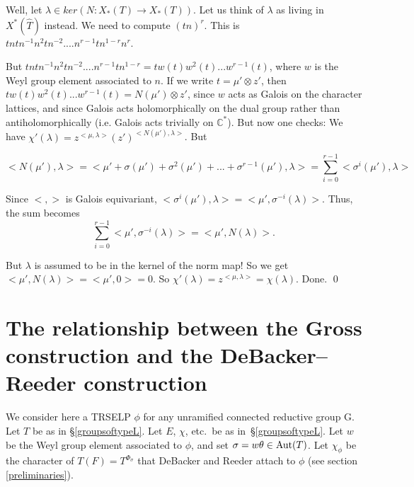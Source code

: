 \documentclass[11pt]{amsart}
\theoremstyle{plain}
\begin{document}
Well, let $\lambda \in ker(N : X_*(T) \rightarrow X_*(T))$.  Let us think of $\lambda$ as living in $X^*(\hat{T})$ instead.  We need to compute $(tn)^r$.  This is $t ntn^{-1} n^2 t n^{-2} .... n^{r-1} t n^{1-r} n^r$.

But $t ntn^{-1} n^2 t n^{-2} .... n^{r-1} t n^{1-r} = t w(t) w^2(t) ... w^{r-1}(t)$, where $w$ is the Weyl group element associated to $n$.  If we write $t = \mu' \otimes z'$, then $t w(t) w^2(t) ... w^{r-1}(t) = N(\mu' ) \otimes z'$, since $w$ acts as Galois on the character lattices, and since Galois acts holomorphically on the dual group rather than antiholomorphically (i.e. Galois acts trivially on $\mathbb{C}^*$).  But now one checks: We have $\chi'(\lambda) = z^{<\mu, \lambda>} (z' )^{<N(\mu'), \lambda>}$.  But

$$<N(\mu'), \lambda> = < \mu' + \sigma(\mu') + \sigma^2(\mu') + ... + \sigma^{r-1}(\mu'), \lambda> = \displaystyle\sum_{i=0}^{r-1} < \sigma^i(\mu'), \lambda >$$

Since $< , >$ is Galois equivariant, $<\sigma^i(\mu'), \lambda> = <\mu', \sigma^{-i}(\lambda)>$.  Thus, the sum becomes $$\displaystyle\sum_{i=0}^{r-1} <\mu', \sigma^{-i}(\lambda)> = <\mu', N(\lambda)>.$$

But $\lambda$ is assumed to be in the kernel of the norm map!  So we get $<\mu', N(\lambda)> = <\mu', 0> = 0$.  So $\chi'(\lambda) = z^{<\mu, \lambda>} = \chi(\lambda)$.  Done.
\qed

\section{The relationship between the Gross construction and the DeBacker--Reeder construction}\label{grossdebackerreeder}

We consider here a TRSELP $\phi$ for any unramified connected reductive group G.  Let $T$ be as in \S\ref{groupsoftypeL}.  Let $E$, $\chi$, etc.~be as in~\S\ref{groupsoftypeL}.  Let $w$ be the Weyl group element associated to $\phi$, and set $\sigma = w \theta\in {\rm Aut}(T)$.  Let $\chi_{\phi}$ be the character of $T(F) = T^{\Phi_{\sigma}}$ that DeBacker and Reeder attach to $\phi$ (see section \ref{preliminaries}).
\end{document}
